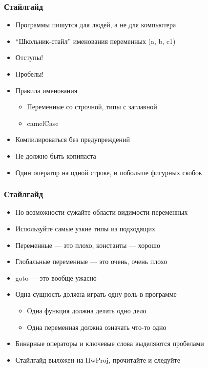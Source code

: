 \documentclass{../../slides-style}
\begin{document}
    
    \begin{frame}[plain]
        \titlepage
    \end{frame}
    
    \begin{frame}
        \frametitle{Стайлгайд}
        \begin{itemize}
            \item Программы пишутся для людей, а не для компьютера
            \item \enquote{Школьник-стайл} именования переменных (a, b, c1)
            \item Отступы!
            \item Пробелы!
            \item Правила именования
            \begin{itemize}
                \item Переменные со строчной, типы с заглавной
                \item camelCase
            \end{itemize}
            \item Компилироваться без предупреждений
            \item Не должно быть копипаста
            \item Один оператор на одной строке, и побольше фигурных скобок
        \end{itemize}
    \end{frame}

    \begin{frame}
        \frametitle{Стайлгайд}
        \begin{itemize}
            \item По возможности сужайте области видимости переменных
            \item Используйте самые узкие типы из подходящих
            \item Переменные --- это плохо, константы --- хорошо
            \item Глобальные переменные --- это очень, очень плохо
            \item goto --- это вообще ужасно
            \item Одна сущность должна играть одну роль в программе
            \begin{itemize}
                \item Одна функция должна делать одно дело
                \item Одна переменная должна означать что-то одно
            \end{itemize}
            \item Бинарные операторы и ключевые слова выделяются пробелами
            \item Стайлгайд выложен на HwProj, прочитайте и следуйте
        \end{itemize}
    \end{frame}
\end{document}
